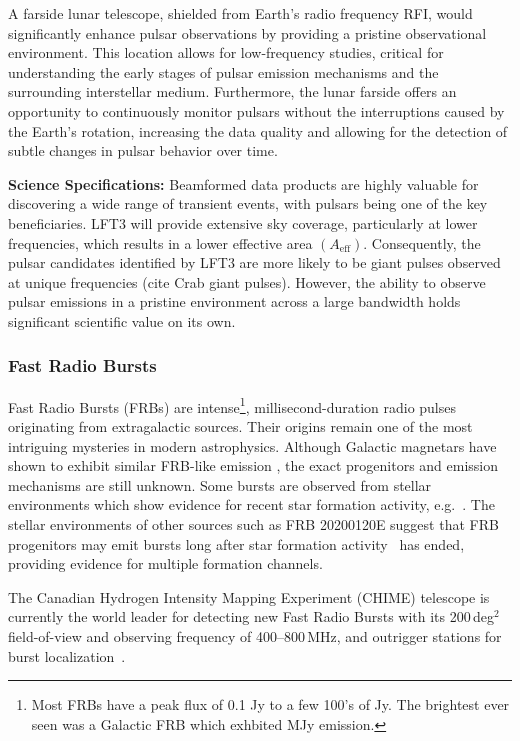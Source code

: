 A farside lunar telescope, shielded from Earth’s radio frequency RFI, would significantly enhance pulsar observations by providing a pristine observational environment. This location allows for low-frequency studies, critical for understanding the early stages of pulsar emission mechanisms and the surrounding interstellar medium. Furthermore, the lunar farside offers an opportunity to continuously monitor pulsars without the interruptions caused by the Earth’s rotation, increasing the data quality and allowing for the detection of subtle changes in pulsar behavior over time.


\textbf{Science Specifications:} Beamformed data products are highly valuable for discovering a wide range of transient events, with pulsars being one of the key beneficiaries. LFT3 will provide extensive sky coverage, particularly at lower frequencies, which results in a lower effective area $(A_{\text{eff}})$. Consequently, the pulsar candidates identified by LFT3 are more likely to be giant pulses observed at unique frequencies (cite Crab giant pulses). However, the ability to observe pulsar emissions in a pristine environment across a large bandwidth holds significant scientific value on its own. 



\subsubsection{Fast Radio Bursts}
Fast Radio Bursts (FRBs) are intense\footnote{Most FRBs have a peak flux of 0.1 Jy to a few 100's of Jy. The brightest ever seen was a Galactic FRB which exhbited MJy emission.}, millisecond-duration radio pulses originating from extragalactic sources. Their origins remain one of the most intriguing mysteries in modern astrophysics. Although Galactic magnetars have shown to exhibit similar FRB-like emission \citep{BC_2020,chime2020sgr1935}, the exact progenitors and emission mechanisms are still unknown. Some bursts are observed from stellar environments which show evidence for recent star formation activity, e.g.~\citet{piro2021}. The stellar environments of other sources such as FRB 20200120E suggest that FRB progenitors may emit bursts long after star formation activity~\citep{kirsten2022m81} has ended, providing evidence for multiple formation channels.

The Canadian Hydrogen Intensity Mapping Experiment (CHIME) telescope is currently the world leader for detecting new Fast Radio Bursts with its 200\,deg$^{2}$ field-of-view and observing frequency of 400--800\,MHz, and outrigger stations for burst localization~\citep{leung2021synoptic,lanman2024kko}. 

